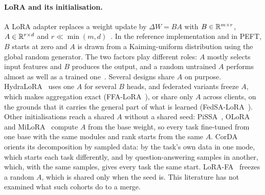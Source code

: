 \paragraph{LoRA and its initialisation.} A LoRA adapter replaces a weight
update by $\Delta W = BA$ with $B \in \mathbb{R}^{m\times r}$, $A \in \mathbb{R}^{r\times d}$
and $r \ll \min(m, d)$~\citep{hu2022lora}. In the reference implementation and
in PEFT, $B$ starts at zero and $A$ is drawn from a Kaiming-uniform
distribution using the global random generator. The two factors play different
roles: $A$ mostly selects input features and $B$ produces the output, and a
random untrained $A$ performs almost as well as a trained
one~\citep{zhu2024asymmetry}. Several designs share $A$ on purpose.
HydraLoRA~\citep{tian2024hydralora} uses one $A$ for several $B$ heads, and
federated variants freeze $A$, which makes aggregation exact
(FFA-LoRA~\citep{sun2024ffalora}), or share only $A$ across clients, on the
grounds that it carries the general part of what is learned
(FedSA-LoRA~\citep{guo2025fedsalora}).
Other initialisations reach a shared $A$ without a shared seed:
PiSSA~\citep{meng2024pissa}, OLoRA~\citep{buyukakyuz2024olora} and
MiLoRA~\citep{wang2025milora} compute $A$ from the base weight, so every task
fine-tuned from one base with the same modules and rank starts from the same
$A$. CorDA~\citep{yang2024corda} orients its decomposition by sampled data:
by the task's own data in one mode, which starts each task differently, and by
question-answering samples in another, which, with the same samples, gives
every task the same start. LoRA-FA~\citep{zhang2023lorafa} freezes a random $A$, which is
shared only when the seed is. This literature has not examined what such
cohorts do to a merge.

